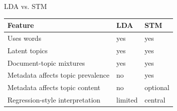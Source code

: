 \documentclass[aspectratio=169]{beamer}
\begin{document}
\begin{frame}{LDA vs. STM}
\begin{center}
\begin{tabular}{lll}
\toprule
Feature & LDA & STM \\
\midrule
Uses words & yes & yes \\
Latent topics & yes & yes \\
Document-topic mixtures & yes & yes \\
Metadata affects topic prevalence & no & yes \\
Metadata affects topic content & no & optional \\
Regression-style interpretation & limited & central \\
\bottomrule
\end{tabular}
\end{center}
\end{frame}

\end{document}
